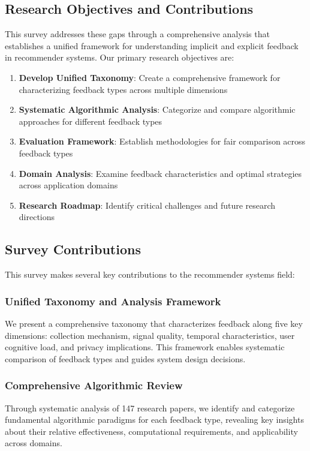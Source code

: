 \subsection{Research Objectives and Contributions}

This survey addresses these gaps through a comprehensive analysis that establishes a unified framework for understanding implicit and explicit feedback in recommender systems. Our primary research objectives are:

\begin{enumerate}
    \item \textbf{Develop Unified Taxonomy}: Create a comprehensive framework for characterizing feedback types across multiple dimensions
    \item \textbf{Systematic Algorithmic Analysis}: Categorize and compare algorithmic approaches for different feedback types
    \item \textbf{Evaluation Framework}: Establish methodologies for fair comparison across feedback types
    \item \textbf{Domain Analysis}: Examine feedback characteristics and optimal strategies across application domains
    \item \textbf{Research Roadmap}: Identify critical challenges and future research directions
\end{enumerate}

\subsection{Survey Contributions}

This survey makes several key contributions to the recommender systems field:

\subsubsection{Unified Taxonomy and Analysis Framework}
We present a comprehensive taxonomy that characterizes feedback along five key dimensions: collection mechanism, signal quality, temporal characteristics, user cognitive load, and privacy implications. This framework enables systematic comparison of feedback types and guides system design decisions.

\subsubsection{Comprehensive Algorithmic Review}
Through systematic analysis of 147 research papers, we identify and categorize fundamental algorithmic paradigms for each feedback type, revealing key insights about their relative effectiveness, computational requirements, and applicability across domains.


